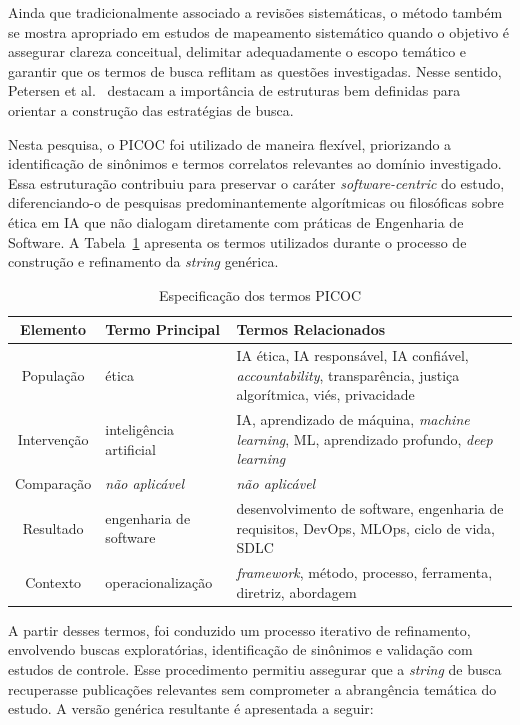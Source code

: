 Ainda que tradicionalmente associado a revisões sistemáticas, o método também se mostra apropriado em estudos de mapeamento sistemático quando o objetivo é assegurar clareza conceitual, delimitar adequadamente o escopo temático e garantir que os termos de busca reflitam as questões investigadas. Nesse sentido, Petersen et al.~\cite{Petersen2015} destacam a importância de estruturas bem definidas para orientar a construção das estratégias de busca.

Nesta pesquisa, o PICOC foi utilizado de maneira flexível, priorizando a identificação de sinônimos e termos correlatos relevantes ao domínio investigado. Essa estruturação contribuiu para preservar o caráter \textit{software-centric} do estudo, diferenciando-o de pesquisas predominantemente algorítmicas ou filosóficas sobre ética em IA que não dialogam diretamente com práticas de Engenharia de Software. A Tabela~\ref{tab:picoc} apresenta os termos utilizados durante o processo de construção e refinamento da \textit{string} genérica.
\begin{table}[htbp]
  \centering
  \caption{Especificação dos termos PICOC}
  \label{tab:picoc}
  \begin{tabular}{cp{3.5cm}p{8.5cm}}
    \hline
    \textbf{Elemento} & \textbf{Termo Principal} & \textbf{Termos Relacionados} \\
    \hline
    População & ética & IA ética, IA responsável, IA confiável, \textit{accountability}, transparência, justiça algorítmica, viés, privacidade \\
    Intervenção & inteligência artificial & IA, aprendizado de máquina, \textit{machine learning}, ML, aprendizado profundo, \textit{deep learning} \\
    Comparação & \textit{não aplicável} & \textit{não aplicável} \\
    Resultado & engenharia de software & desenvolvimento de software, engenharia de requisitos, DevOps, MLOps, ciclo de vida, SDLC \\
    Contexto & operacionalização & \textit{framework}, método, processo, ferramenta, diretriz, abordagem \\
    \hline
  \end{tabular}
\end{table}

A partir desses termos, foi conduzido um processo iterativo de refinamento, envolvendo buscas exploratórias, identificação de sinônimos e validação com estudos de controle. Esse procedimento permitiu assegurar que a \textit{string} de busca recuperasse publicações relevantes sem comprometer a abrangência temática do estudo. A versão genérica resultante é apresentada a seguir:

